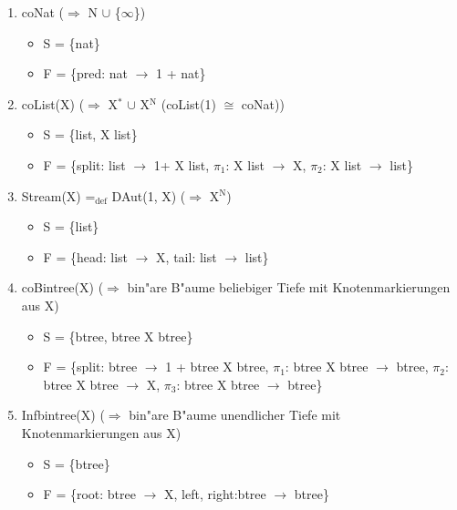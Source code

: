 \documentclass[11pt]{article}
\begin{document}
\begin{enumerate}
\item coNat ($\Rightarrow$ N $\cup$ \{$\infty$\})
\label{sec-2-5-2-1}
\begin{itemize}
\item S = \{nat\}
\item F = \{pred: nat $\to$ 1 + nat\}
\end{itemize}

\item coList(X) ($\Rightarrow$ X$^{\text{*}}$ $\cup$ X$^{\text{N}}$ (coList(1) $\cong$ coNat))
\label{sec-2-5-2-2}
\begin{itemize}
\item S = \{list, X \texttimes{} list\}
\item F = \{split: list $\to$ 1+ X \texttimes{} list, $\pi$$_{\text{1}}$: X \texttimes{} list $\to$ X, $\pi$$_{\text{2}}$: X \texttimes{} list $\to$ list\}
\end{itemize}

\item Stream(X) =$_{\text{def}}$ DAut(1, X) ($\Rightarrow$ X$^{\text{N}}$)
\label{sec-2-5-2-3}
\begin{itemize}
\item S = \{list\}
\item F = \{head: list $\to$ X, tail: list $\to$ list\}
\end{itemize}

\item coBintree(X) ($\Rightarrow$ bin"are B"aume beliebiger Tiefe mit Knotenmarkierungen aus X)
\label{sec-2-5-2-4}
\begin{itemize}
\item S = \{btree, btree \texttimes{} X \texttimes{} btree\}
\item F = \{split: btree $\to$ 1 + btree \texttimes{} X \texttimes{} btree, $\pi$$_{\text{1}}$: btree \texttimes{} X \texttimes{} btree $\to$ btree, $\pi$$_{\text{2}}$: btree \texttimes{} X \texttimes{} btree $\to$ X, $\pi$$_{\text{3}}$: btree \texttimes{} X \texttimes{} btree $\to$ btree\}
\end{itemize}

\item Infbintree(X) ($\Rightarrow$ bin"are B"aume unendlicher Tiefe mit Knotenmarkierungen aus X)
\label{sec-2-5-2-5}
\begin{itemize}
\item S = \{btree\}
\item F = \{root: btree $\to$ X, left, right:btree $\to$ btree\}
\end{itemize}


\end{enumerate}
\end{document}
